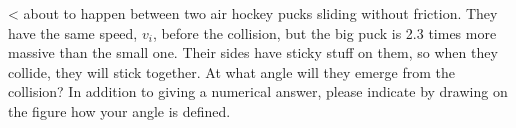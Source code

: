 <%
about to happen between two air hockey pucks sliding without
friction. They have the same speed, $v_i$, before the
collision, but the big puck is 2.3 times more massive than
the small one. Their sides have sticky stuff on them, so
when they collide, they will stick together. At what angle
will they emerge from the collision? In addition to giving
a numerical answer, please indicate by drawing on the figure
how your angle is defined.
